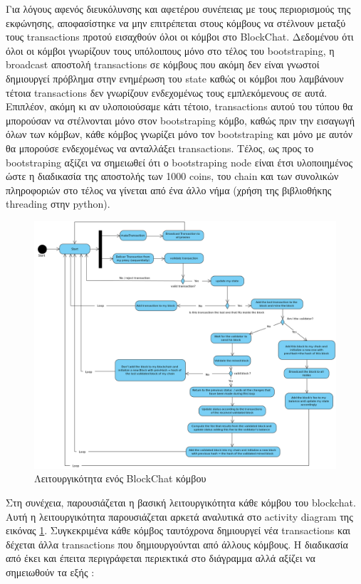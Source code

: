 \documentclass[12pt, a4paper]{article}
\begin{document}
\noindent
	Για λόγους αφενός διευκόλυνσης και αφετέρου συνέπειας με τους περιορισμούς της εκφώνησης, αποφασίστηκε να μην επιτρέπεται στους κόμβους να στέλνουν μεταξύ τους transactions προτού εισαχθούν όλοι οι κόμβοι στο BlockChat. Δεδομένου ότι όλοι οι κόμβοι γνωρίζουν τους υπόλοιπους μόνο στο τέλος του bootstraping, η broadcast αποστολή transactions σε κόμβους που ακόμη δεν είναι γνωστοί δημιουργεί πρόβλημα στην ενημέρωση του state καθώς οι κόμβοι που λαμβάνουν τέτοια transactions δεν γνωρίζουν ενδεχομένως τους εμπλεκόμενους σε αυτά. Επιπλέον, ακόμη κι αν υλοποιούσαμε κάτι τέτοιο, transactions αυτού του τύπου θα μπορούσαν να στέλνονται μόνο στον bootstraping κόμβο, καθώς πριν την εισαγωγή όλων των κόμβων, κάθε κόμβος γνωρίζει μόνο τον bootstraping και μόνο με αυτόν θα μπορούσε ενδεχομένως να ανταλλάξει transactions. Τέλος, ως προς το bootstraping αξίζει να σημειωθεί ότι ο bootstraping node είναι έτσι υλοποιημένος ώστε η διαδικασία της αποστολής των 1000 coins, του chain και των συνολικών πληροφοριών στο τέλος να γίνεται από ένα άλλο νήμα (χρήση της βιβλιοθήκης threading στην python). 
		\begin{figure}[b!]
		\centering
		\includegraphics[width=7in]{activityDiagram.png}
		\caption{Λειτουργικότητα ενός BlockChat κόμβου}
		\label{fig:activity}
	\end{figure}
	\noindent
	Στη συνέχεια, παρουσιάζεται η βασική λειτουργικότητα κάθε κόμβου του blockchat. Αυτή η λειτουργικότητα παρουσιάζεται αρκετά αναλυτικά στο activity diagram της εικόνας \ref{fig:activity}. Συγκεκριμένα κάθε κόμβος ταυτόχρονα δημιουργεί νέα transactions και δέχεται άλλα transactions που δημιουργούνται από άλλους κόμβους. Η διαδικασία από έκει και έπειτα περιγράφεται περιεκτικά στο διάγραμμα αλλά αξίζει να σημειωθούν τα εξής :
\end{document}
